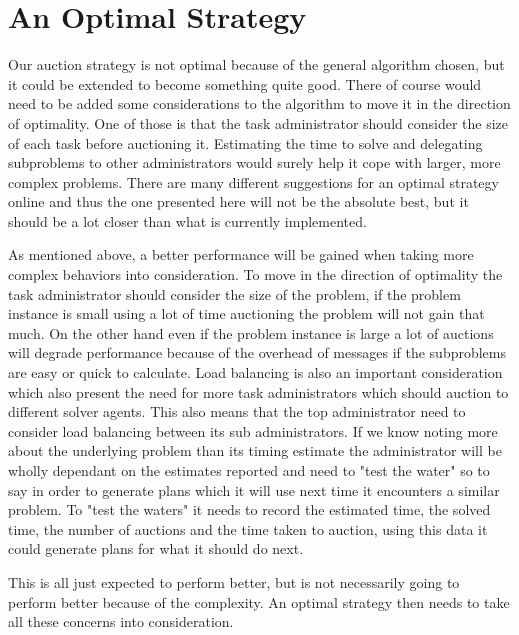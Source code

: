 \section{An Optimal Strategy}\label{sec:optimal-strategy}
Our auction strategy is not optimal because of the general algorithm chosen, but
it could be extended to become something quite good. There of course would need
to be added some considerations to the algorithm to move it in the direction of
optimality. One of those is that the task administrator should consider the size
of each task before auctioning it. Estimating the time to solve and delegating
subproblems to other administrators would surely help it cope with larger, more
complex problems. There are many different suggestions for an optimal strategy
online and thus the one presented here will not be the absolute best, but it
should be a lot closer than what is currently implemented.

As mentioned above, a better performance will be gained when taking more complex
behaviors into consideration. To move in the direction of optimality the task
administrator should consider the size of the problem, if the problem instance
is small using a lot of time auctioning the problem will not gain that much. On
the other hand even if the problem instance is large a lot of auctions will
degrade performance because of the overhead of messages if the subproblems are
easy or quick to calculate. Load balancing is also an important consideration
which also present the need for more task administrators which should auction to
different solver agents. This also means that the top administrator need to
consider load balancing between its sub administrators. If we know noting more
about the underlying problem than its timing estimate the administrator will be
wholly dependant on the estimates reported and need to "test the water" so to
say in order to generate plans which it will use next time it encounters a
similar problem. To "test the waters" it needs to record the estimated time, the
solved time, the number of auctions and the time taken to auction, using this
data it could generate plans for what it should do next. 

This is all just expected to perform better, but is not necessarily going to
perform better because of the complexity. An optimal strategy then needs to take
all these concerns into consideration.
